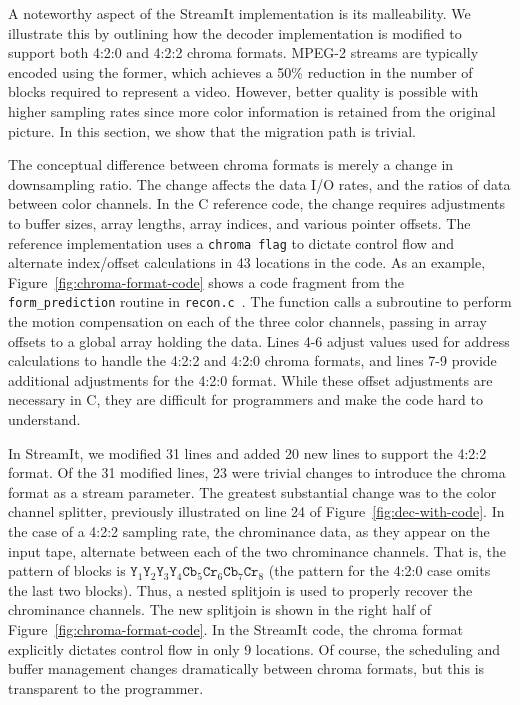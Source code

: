 \vspace{-8pt}A noteworthy aspect of the StreamIt implementation is its
malleability. We illustrate this by outlining how the decoder
implementation is modified to support both 4:2:0 and 4:2:2 chroma
formats. MPEG-2 streams are typically encoded using the former, which
achieves a 50\% reduction in the number of blocks required to
represent a video. However, better quality is possible with higher
sampling rates since more color information is retained from the
original picture. In this section, we show that the migration path is
trivial.

The conceptual difference between chroma formats is merely a change in
downsampling ratio. The change affects the data I/O rates, and the
ratios of data between color channels. In the C reference code, the
change requires adjustments to buffer sizes, array lengths, array
indices, and various pointer offsets. The reference implementation
uses a \texttt{chroma flag} to dictate control flow and alternate
index/offset calculations {\newpage\noindent}in 43 locations in the code. As an example,
Figure~\ref{fig:chroma-format-code} shows a code fragment from the
\texttt{form\_prediction} routine in
\texttt{recon.c}~\cite{reference-mpeg-c}. The function calls a
subroutine to perform the motion compensation on each of the three
color channels, passing in array offsets to a global array holding the
data. Lines 4-6 adjust values used for address calculations to handle
the 4:2:2 and 4:2:0 chroma formats, and lines 7-9 provide additional
adjustments for the 4:2:0 format. While these offset adjustments are
necessary in C, they are difficult for programmers and make the code
hard to understand.

In StreamIt, we modified 31 lines and added 20 new lines to support
the 4:2:2 format. Of the 31 modified lines, 23 were trivial changes to
introduce the chroma format as a stream parameter. The greatest
substantial change was to the color channel splitter, previously
illustrated on line 24 of Figure~\ref{fig:dec-with-code}. In the case
of a 4:2:2 sampling rate, the chrominance data, as they appear on the
input tape, alternate between each of the two chrominance
channels. That is, the pattern of blocks is $\texttt{Y}_1 \texttt{Y}_2
\texttt{Y}_3 \texttt{Y}_4 \texttt{Cb}_5 \texttt{Cr}_6 \texttt{Cb}_7
\texttt{Cr}_8$ (the pattern for the 4:2:0 case omits the last two
blocks). Thus, a nested splitjoin is used to properly recover the
chrominance channels. The new splitjoin is shown in the right half of
Figure~\ref{fig:chroma-format-code}.  In the StreamIt code, the chroma
format explicitly dictates control flow in only 9 locations. Of
course, the scheduling and buffer management changes dramatically
between chroma formats, but this is transparent to the programmer.

